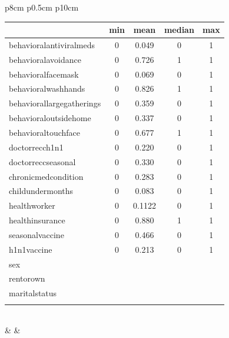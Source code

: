 \documentclass{IEEEtran}
\begin{document}
\begin{@twocolumnfalse}
\begin{center}
{\begin{tabular}{p{8cm} p{0.5cm} p{10cm}}
\begin{tabular}{| l |c|c|c|c|} %
\hline 
& \textbf{min} & \textbf{mean} & \textbf{median} & \textbf{max} \\
\hline 
behavioral\textunderscore antiviral\textunderscore meds & 0 & 0.049 & 0 & 1\\
\hline
behavioral\textunderscore avoidance & 0 & 0.726 & 1 & 1\\
\hline 
behavioral\textunderscore face\textunderscore mask & 0 & 0.069 & 0 & 1\\
\hline 
behavioral\textunderscore wash\textunderscore hands & 0 & 0.826 & 1 & 1\\
\hline 
behavioral\textunderscore large\textunderscore gatherings & 0 & 0.359 & 0 & 1\\
\hline
behavioral\textunderscore outside\textunderscore home & 0 & 0.337 & 0 & 1\\
\hline 
behavioral\textunderscore touch\textunderscore face & 0 & 0.677 & 1 & 1\\
\hline 
doctor\textunderscore recc\textunderscore h1n1 & 0 & 0.220 & 0 & 1\\
\hline 
doctor\textunderscore recc\textunderscore seasonal & 0 & 0.330 & 0 & 1\\
\hline 
chronic\textunderscore med\textunderscore condition & 0 & 0.283 & 0 & 1\\
\hline 
child\textunderscore under\textunderscore 6\textunderscore months & 0 & 0.083 & 0 & 1\\
\hline
health\textunderscore worker & 0 & 0.1122 & 0 & 1\\
\hline
health\textunderscore insurance & 0 & 0.880 & 1 & 1\\
\hline
seasonal\textunderscore vaccine & 0 & 0.466 & 0 & 1\\
\hline
h1n1\textunderscore vaccine & 0 & 0.213 & 0 & 1\\
\hline
sex & & & &\\
\hline
rent\textunderscore or\textunderscore own & & & &\\
\hline
marital\textunderscore status & & & &\\
\hline
\multicolumn{4}{l}{}\\
\end{tabular}\\
& & \\
\\
\end{tabular}%
}
\end{center}
\end{@twocolumnfalse}
\end{document}
